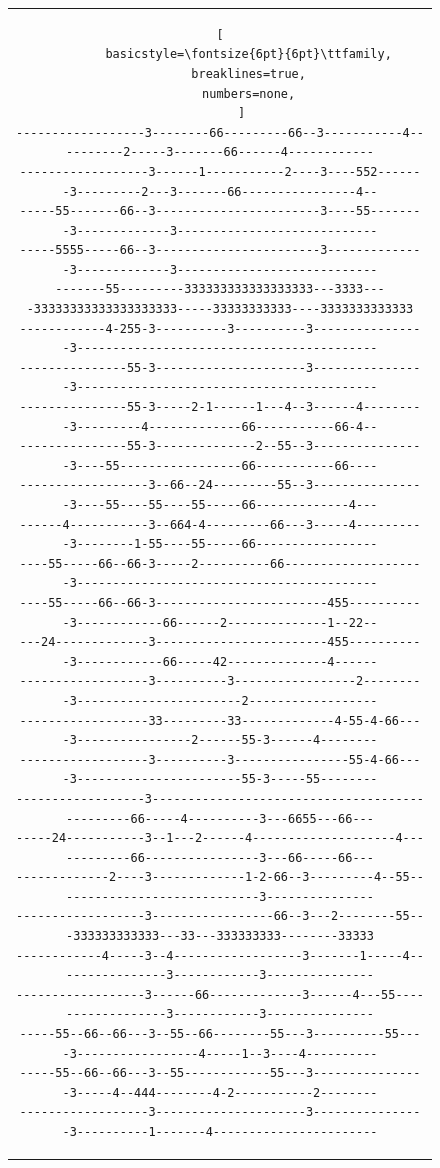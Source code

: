 \documentclass[12pt,a4paper]{article}
\begin{document}
\begin{figure}[H]
\begin{tabular}{c}
\begin{lstlisting}[
        basicstyle=\fontsize{6pt}{6pt}\ttfamily,
        breaklines=true,
        numbers=none,
      ]
------------------3--------66---------66--3-----------4----------2-----3-------66------4------------
------------------3------1-----------2----3----552-------3---------2---3-------66----------------4--
-----55-------66--3-----------------------3----55--------3-------------3----------------------------
-----5555-----66--3-----------------------3--------------3-------------3----------------------------
-------55---------333333333333333333---3333----33333333333333333333-----33333333333----3333333333333
------------4-255-3----------3----------3----------------3------------------------------------------
---------------55-3---------------------3----------------3------------------------------------------
---------------55-3-----2-1------1---4--3------4---------3---------4-------------66-----------66-4--
---------------55-3--------------2--55--3----------------3----55-----------------66-----------66----
------------------3--66--24---------55--3----------------3----55----55----55-----66-------------4---
------4-----------3--664-4---------66---3-----4----------3--------1-55----55-----66-----------------
----55-----66--66-3-----2----------66--------------------3------------------------------------------
----55-----66--66-3------------------------455-----------3------------66------2--------------1--22--
---24-------------3------------------------455-----------3------------66-----42--------------4------
------------------3----------3-----------------2---------3-----------------------2------------------
------------------33---------33-------------4-55-4-66----3----------------2------55-3------4--------
------------------3----------3----------------55-4-66----3-----------------------55-3-----55--------
------------------3-----------------------------------------------66-----4----------3---6655---66---
-----24-----------3--1---2------4--------------------4------------66----------------3---66-----66---
-------------2----3-------------1-2-66--3---------4--55-----------------------------3---------------
------------------3-----------------66--3---2--------55---333333333333---33---333333333--------33333
------------4-----3--4------------------3-------1-----4----------------3------------3---------------
------------------3------66-------------3------4---55------------------3------------3---------------
-----55--66--66---3--55--66--------55---3----------55----3-----------------4-----1--3----4----------
-----55--66--66---3--55------------55---3----------------3-----4--444--------4-2-----------2--------
------------------3---------------------3----------------3----------1-------4-----------------------

\end{lstlisting}
\end{tabular}
\end{figure}
\end{document}
